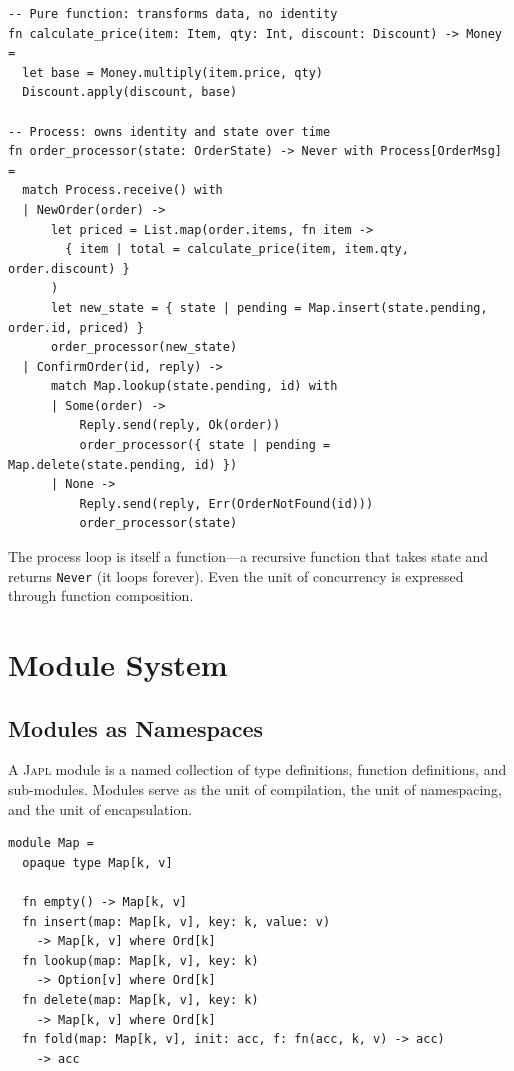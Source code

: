 \documentclass[11pt,a4paper]{article}
\newcommand{\japl}{\textsc{Japl}}
\begin{document}
\begin{lstlisting}
-- Pure function: transforms data, no identity
fn calculate_price(item: Item, qty: Int, discount: Discount) -> Money =
  let base = Money.multiply(item.price, qty)
  Discount.apply(discount, base)

-- Process: owns identity and state over time
fn order_processor(state: OrderState) -> Never with Process[OrderMsg] =
  match Process.receive() with
  | NewOrder(order) ->
      let priced = List.map(order.items, fn item ->
        { item | total = calculate_price(item, item.qty, order.discount) }
      )
      let new_state = { state | pending = Map.insert(state.pending, order.id, priced) }
      order_processor(new_state)
  | ConfirmOrder(id, reply) ->
      match Map.lookup(state.pending, id) with
      | Some(order) ->
          Reply.send(reply, Ok(order))
          order_processor({ state | pending = Map.delete(state.pending, id) })
      | None ->
          Reply.send(reply, Err(OrderNotFound(id)))
          order_processor(state)
\end{lstlisting}

The process loop is itself a function---a recursive function that takes state and returns \texttt{Never} (it loops forever). Even the unit of concurrency is expressed through function composition.


\section{Module System}
\label{sec:module-system}

\subsection{Modules as Namespaces}

A \japl{} module is a named collection of type definitions, function definitions, and sub-modules. Modules serve as the unit of compilation, the unit of namespacing, and the unit of encapsulation.

\begin{lstlisting}
module Map =
  opaque type Map[k, v]

  fn empty() -> Map[k, v]
  fn insert(map: Map[k, v], key: k, value: v)
    -> Map[k, v] where Ord[k]
  fn lookup(map: Map[k, v], key: k)
    -> Option[v] where Ord[k]
  fn delete(map: Map[k, v], key: k)
    -> Map[k, v] where Ord[k]
  fn fold(map: Map[k, v], init: acc, f: fn(acc, k, v) -> acc)
    -> acc
\end{lstlisting}
\end{document}
